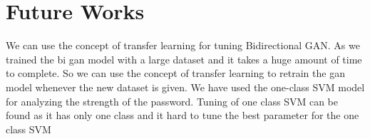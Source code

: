 \documentclass[runningheads]{llncs}
\begin{document}
\section{Future Works}
We can use the concept of transfer learning for tuning Bidirectional GAN. As we trained the bi gan model with a large dataset and it takes a huge amount of time to complete. So we can use the concept of transfer learning to retrain the gan model whenever the new dataset is given. We have used the one-class SVM model for analyzing the strength of the password. Tuning of one class SVM can be found as it has only one class and it hard to tune the best parameter for the one class SVM 
%
%
%
% 
% 
%
%



\end{document}
